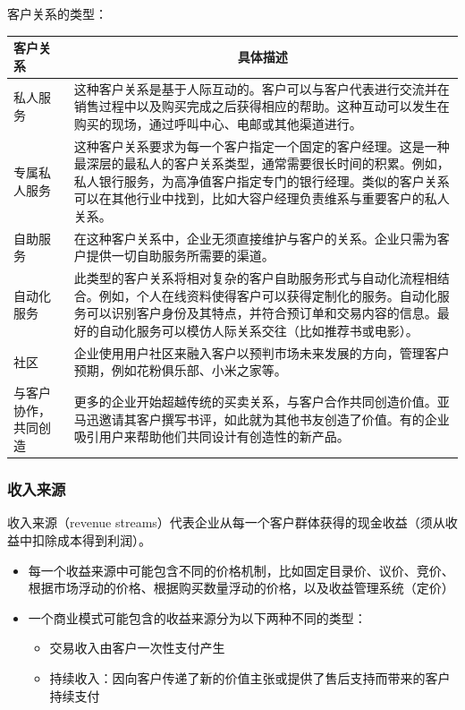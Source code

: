 	客户关系的类型：
	\begin{table}[H]
		\centering
		\begin{tabularx}{0.8\textwidth}{|l|X|}
		\hline
		客户关系       & \multicolumn{1}{c|}{具体描述}                                                                                                   \\ \hline
		私人服务       & 这种客户关系是基于人际互动的。客户可以与客户代表进行交流并在销售过程中以及购买完成之后获得相应的帮助。这种互动可以发生在购买的现场，通过呼叫中心、电邮或其他渠道进行。                                         \\ \hline
		专属私人服务     & 这种客户关系要求为每一个客户指定一个固定的客户经理。这是一种最深层的最私人的客户关系类型，通常需要很长时间的积累。例如，私人银行服务，为高净值客户指定专门的银行经理。类似的客户关系可以在其他行业中找到，比如大容户经理负责维系与重要客户的私人关系。 \\ \hline
		自助服务       & 在这种客户关系中，企业无须直接维护与客户的关系。企业只需为客户提供一切自助服务所需要的渠道。                                                                              \\ \hline
		自动化服务      & 此类型的客户关系将相对复杂的客户自助服务形式与自动化流程相结合。例如，个人在线资料使得客户可以获得定制化的服务。自动化服务可以识别客户身份及其特点，并符合预订单和交易内容的信息。最好的自动化服务可以模仿人际关系交往（比如推荐书或电影）。      \\ \hline
		社区         & 企业使用用户社区来融入客户以预判市场未来发展的方向，管理客户预期，例如花粉俱乐部、小米之家等。                                                                             \\ \hline
		与客户协作，共同创造 & 更多的企业开始超越传统的买卖关系，与客户合作共同创造价值。亚马迅邀请其客户撰写书评，如此就为其他书友创造了价值。有的企业吸引用户来帮助他们共同设计有创造性的新产品。                                          \\ \hline
		\end{tabularx}
		\end{table}

	\subsubsection{收入来源}
	收入来源（revenue streams）代表企业从每一个客户群体获得的现金收益（须从收益中扣除成本得到利润）。
	\begin{itemize}
		\item 每一个收益来源中可能包含不同的价格机制，比如固定目录价、议价、竞价、根据市场浮动的价格、根据购买数量浮动的价格，以及收益管理系统（定价）
		\item 一个商业模式可能包含的收益来源分为以下两种不同的类型：
		\begin{itemize}
			\item 交易收入由客户一次性支付产生
			\item 持续收入：因向客户传递了新的价值主张或提供了售后支持而带来的客户持续支付
		\end{itemize}
	\end{itemize}

